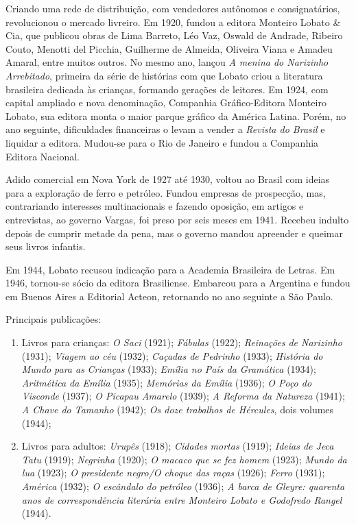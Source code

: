 Criando uma rede de distribuição, com vendedores autônomos e
consignatários, revolucionou o mercado livreiro. Em 1920, fundou a
editora Monteiro Lobato \& Cia, que publicou obras de Lima Barreto, Léo
Vaz, Oswald de Andrade, Ribeiro Couto, Menotti del Picchia, Guilherme de
Almeida, Oliveira Viana e Amadeu Amaral, entre muitos outros. No mesmo
ano, lançou \emph{A menina do Narizinho Arrebitado}, primeira da série
de histórias com que Lobato criou a literatura brasileira dedicada às
crianças, formando gerações de leitores. Em 1924, com capital ampliado e
nova denominação, Companhia Gráfico-Editora Monteiro Lobato, sua editora
monta o maior parque gráfico da América Latina. Porém, no ano seguinte,
dificuldades financeiras o levam a vender a \emph{Revista do Brasil} e
liquidar a editora. Mudou-se para o Rio de Janeiro e fundou a Companhia
Editora Nacional.

Adido comercial em Nova York de 1927 até 1930, voltou ao Brasil com
ideias para a exploração de ferro e petróleo. Fundou empresas de
prospecção, mas, contrariando interesses multinacionais e fazendo
oposição, em artigos e entrevistas, ao governo Vargas, foi preso por
seis meses em 1941. Recebeu indulto depois de cumprir metade da pena,
mas o governo mandou apreender e queimar seus livros infantis.

Em 1944, Lobato recusou indicação para a Academia Brasileira de Letras.
Em 1946, tornou-se sócio da editora Brasiliense. Embarcou para a
Argentina e fundou em Buenos Aires a Editorial Acteon, retornando no ano
seguinte a São Paulo.

Principais publicações:

\begin{enumerate}
\item Livros para crianças: \emph{O Saci} (1921); \emph{Fábulas} (1922);
\emph{Reinações de Narizinho} (1931); \emph{Viagem ao céu} (1932);
\emph{Caçadas de Pedrinho} (1933); \emph{História do Mundo para as}
\emph{Crianças} (1933); \emph{Emília no País da Gramática} (1934);
\emph{Aritmética da Emília} (1935); \emph{Memórias da Emília} (1936);
\emph{O Poço do Visconde} (1937); \emph{O Picapau Amarelo} (1939);
\emph{A Reforma da Natureza} (1941); \emph{A Chave do Tamanho} (1942);
\emph{Os doze trabalhos de Hércules}, dois volumes (1944);

\item Livros para adultos: \emph{Urupês} (1918); \emph{Cidades}
\emph{mortas} (1919); \emph{Ideias de Jeca Tatu} (1919); \emph{Negrinha}
(1920); \emph{O macaco que se fez homem} (1923); \emph{Mundo da lua}
(1923); \emph{O presidente negro/O choque das raças} (1926);
\emph{Ferro} (1931); \emph{América} (1932); \emph{O escândalo do
petróleo} (1936); \emph{A barca de Gleyre: quarenta anos de
correspondência literária entre Monteiro Lobato e Godofredo Rangel}
(1944).
\end{enumerate}

